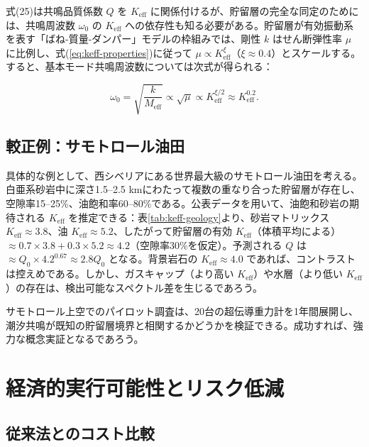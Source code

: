 \documentclass[12pt,a4paper]{article}
\theoremstyle{remark}
\newcommand{\Keff}{K_{\mathrm{eff}}}
\begin{document}
	式(25)は共鳴品質係数 \(Q\) を \(\Keff\) に関係付けるが、貯留層の完全な同定のためには、共鳴周波数 \(\omega_0\) の \(\Keff\) への依存性も知る必要がある。貯留層が有効振動系を表す「ばね-質量-ダンパー」モデルの枠組みでは、剛性 \(k\) はせん断弾性率 \(\mu\) に比例し、式(\ref{eq:keff-properties})に従って \(\mu \propto \Keff^{\xi}\)（\(\xi \approx 0.4\)）とスケールする。すると、基本モード共鳴周波数については次式が得られる：
	
	\begin{equation}
		\omega_0 = \sqrt{\frac{k}{M_{\text{eff}}}} \propto \sqrt{\mu} \propto \Keff^{\xi/2} \approx \Keff^{0.2}.
		\label{eq:omega_keff}
	\end{equation}
	
	\subsection{較正例：サモトロール油田}
	
	具体的な例として、西シベリアにある世界最大級のサモトロール油田を考える。白亜系砂岩中に深さ1.5–2.5 kmにわたって複数の重なり合った貯留層が存在し、空隙率15–25\%、油飽和率60–80\%である。公表データを用いて、油飽和砂岩の期待される \(\Keff\) を推定できる：表\ref{tab:keff-geology}より、砂岩マトリックス \(\Keff \approx 3.8\)、油 \(\Keff \approx 5.2\)、したがって貯留層の有効 \(\Keff\)（体積平均による）\(\approx 0.7 \times 3.8 + 0.3 \times 5.2 \approx 4.2\)（空隙率30\%を仮定）。予測される \(Q\) は \(\approx Q_0 \times 4.2^{0.67} \approx 2.8 Q_0\) となる。背景岩石の \(\Keff \approx 4.0\) であれば、コントラストは控えめである。しかし、ガスキャップ（より高い \(\Keff\)）や水層（より低い \(\Keff\)）の存在は、検出可能なスペクトル差を生じるであろう。
	
	サモトロール上空でのパイロット調査は、20台の超伝導重力計を1年間展開し、潮汐共鳴が既知の貯留層境界と相関するかどうかを検証できる。成功すれば、強力な概念実証となるであろう。
	
	\section{経済的実行可能性とリスク低減}
	\label{sec:economics}
	
	\subsection{従来法とのコスト比較}
	
\end{document}
